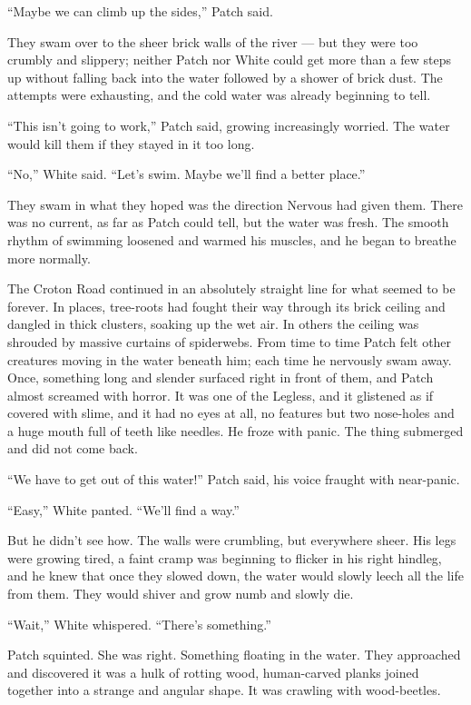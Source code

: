 \documentclass[ebook,oneside,openany,17pt]{memoir}
\newenvironment{tolerant}[1]{%
  \par\tolerance=#1\relax
}{%
  \par
}
\begin{document}
“Maybe we can climb up the sides,” Patch said.

They swam over to the sheer brick walls of the river — but they were
too crumbly and slippery; neither Patch nor White could get more than
a few steps up without falling back into the water followed by a
shower of brick dust. The attempts were exhausting, and the cold water
was already beginning to tell.

“This isn’t going to work,” Patch said, growing increasingly
worried. The water would kill them if they stayed in it too long.

“No,” White said. “Let’s swim. Maybe we’ll find a better place.”

They swam in what they hoped was the direction Nervous had given
them. There was no current, as far as Patch could tell, but the water
was fresh. The smooth rhythm of swimming loosened and warmed his
muscles, and he began to breathe more normally.

\begin{tolerant}{5000}
The Croton Road continued in an absolutely straight line for what
seemed to be forever. In places, tree-roots had fought their way
through its brick ceiling and dangled in thick clusters, soaking up
the wet air. In others the ceiling was shrouded by massive curtains of
spiderwebs. From time to time Patch felt other creatures moving in the
water beneath him; each time he nervously swam away. Once, something
long and slender surfaced right in front of them, and Patch almost
screamed with horror. It was one of the Legless, and it glistened as
if covered with slime, and it had no eyes at all, no features but two
nose-holes and a huge mouth full of teeth like needles. He froze with
panic. The thing submerged and did not come back.
\end{tolerant}

“We have to get out of this water!” Patch said, his voice fraught with
near-panic.

“Easy,” White panted. “We’ll find a way.”

But he didn’t see how. The walls were crumbling, but everywhere
sheer. His legs were growing tired, a faint cramp was beginning to
flicker in his right hindleg, and he knew that once they slowed down,
the water would slowly leech all the life from them. They would shiver
and grow numb and slowly die.

“Wait,” White whispered. “There’s something.”

Patch squinted. She was right. Something floating in the water. They
approached and discovered it was a hulk of rotting wood, human-carved
planks joined together into a strange and angular shape. It was
crawling with wood-beetles.
\end{document}
